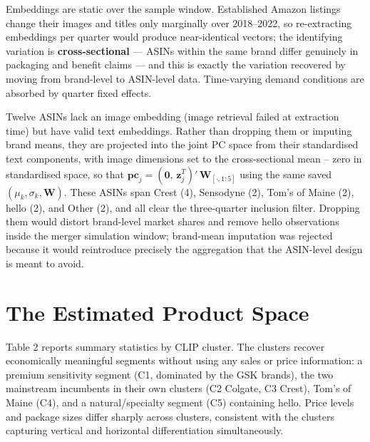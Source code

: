Embeddings are static over the sample window. Established Amazon
listings change their images and titles only marginally over 2018--2022,
so re-extracting embeddings per quarter would produce near-identical
vectors; the identifying variation is \textbf{cross-sectional} --- ASINs
within the same brand differ genuinely in packaging and benefit claims
--- and this is exactly the variation recovered by moving from
brand-level to ASIN-level data. Time-varying demand conditions are
absorbed by quarter fixed effects.

Twelve ASINs lack an image embedding (image retrieval failed at
extraction time) but have valid text embeddings. Rather than dropping
them or imputing brand means, they are projected into the joint PC space
from their standardised text components, with image dimensions set to
the cross-sectional mean -- zero in standardised space, so that
\(\mathbf{pc}_j = (\mathbf{0},\, \mathbf{z}^{T}_j)'\,\mathbf{W}_{[\cdot,1:5]}\)
using the same saved \((\mu_k, \sigma_k, \mathbf{W})\). These ASINs span
Crest (4), Sensodyne (2), Tom's of Maine (2), hello (2), and Other (2),
and all clear the three-quarter inclusion filter. Dropping them would
distort brand-level market shares and remove hello observations inside
the merger simulation window; brand-mean imputation was rejected because
it would reintroduce precisely the aggregation that the ASIN-level
design is meant to avoid.

\section{The Estimated Product Space}\label{the-estimated-product-space}

Table 2 reports summary statistics by CLIP cluster. The clusters recover
economically meaningful segments without using any sales or price
information: a premium sensitivity segment (C1, dominated by the GSK
brands), the two mainstream incumbents in their own clusters (C2
Colgate, C3 Crest), Tom's of Maine (C4), and a natural/specialty segment
(C5) containing hello. Price levels and package sizes differ sharply
across clusters, consistent with the clusters capturing vertical and
horizontal differentiation simultaneously.

